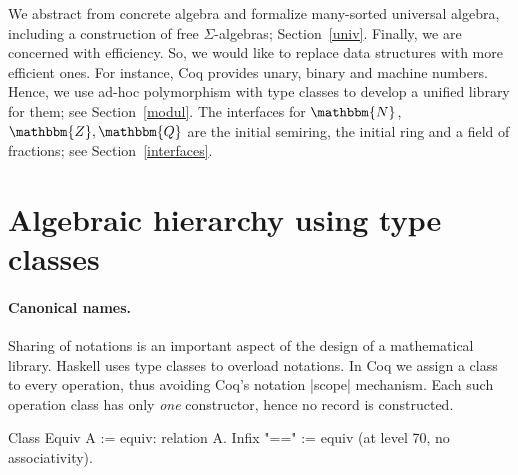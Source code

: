 \documentclass[a4paper,10pt]{llncs}
\newcommand{\N}{\ensuremath{\mathbbm{N}}}
\newcommand{\Z}{\ensuremath{\mathbbm{Z}}}
\newcommand{\Q}{\ensuremath{\mathbbm{Q}}}
\begin{document}

We abstract from concrete algebra and formalize many-sorted universal algebra, including a construction of
free $\Sigma$-algebras; Section~\ref{univ}. Finally, we are concerned with efficiency. So, we would like to replace data structures with more efficient ones. For instance, 
Coq provides unary, binary and machine numbers. Hence, we use ad-hoc polymorphism with type classes to
develop a unified library for them; see Section~\ref{modul}. The interfaces for $\N$, $\Z,\Q$ are the initial semiring, the initial ring and a field of fractions; see Section~\ref{interfaces}.


\section{Algebraic hierarchy using type classes}\label{classes}
\vspace*{-2ex}
\paragraph{Canonical names.}\label{names}
Sharing of notations is an important aspect of the design of a mathematical library. Haskell uses
type classes to overload notations. In Coq we assign a class to every operation, thus avoiding Coq's notation |scope| mechanism.
 Each such operation class has only \emph{one} constructor, hence no record is constructed.
\begin{code}
 Class Equiv A := equiv: relation A.
 Infix "==" := equiv (at level 70, no associativity).
\end{code}
\vspace*{-5ex}
\end{document}
